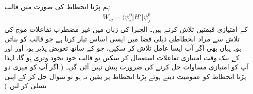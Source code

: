 ہم  پڑتا انحطاط کی صورت میں  قالب:
\begin{align}
W_{i j} = \langle \psi_i^0 | H' | \psi_j^0
\end{align}
کے امتیازی قیمتیں تلاش کرتے ہیں۔ الجبرا کی زبان میں  غیر مضطرب تفاعلات موج کی تلاش سے مراد انحطاطی ذيلی فضا میں ایسی اساس تیار کرنا ہے جو قالب  کو  بناتی ہو۔ یہاں بھی اگر آپ ایسا عامل  تلاش کر سکیں، جو  کے ساتھ تعویض پذیر  ہو، اور  اور  کے بیک وقت امتیازی تفاعلات استعمال کر سکیں تو قالب  خود بخود وتری ہو گا، لہٰذا آپ کو امتیازی مساوات حل کرنے کی ضرورت پیش نہیں آئی گی۔ ( اگر آپ کو میری دو پڑتا انحطاط کو عمومیت دیتے ہوئے  پڑتا انحطاط پر یقین نہ ہو تو سوال  حل کر کے اپنی تسلی کر لیں۔)

